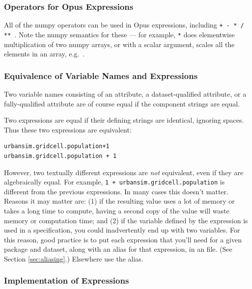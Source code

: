 {\subsubsection{Operators for Opus Expressions}

All of the numpy operators can be used in Opus expressions, including
\verb|+ - * / ** |.  Note the numpy semantics for these --- for example,
\verb|*| does elementwise multiplication of two numpy arrays, or with a
scalar argument, scales all the elements in an array,
e.g.\ .

\subsubsection{Equivalence of Variable Names and Expressions}

Two variable names consisting of an attribute, a dataset-qualified
attribute, or a fully-qualified attribute are of course equal if the
component strings are equal.

Two expressions are equal if their defining strings are identical, ignoring
spaces.  Thus these two expressions are equivalent:

\begin{verbatim}
urbansim.gridcell.population+1
urbansim.gridcell.population + 1
\end{verbatim}

However, two textually different expressions are \emph{not} equivalent,
even if they are algebraically equal.  For example,
\verb|1 + urbansim.gridcell.population| is different from the previous
expressions.  In many cases this doesn't matter.  Reasons it may matter
are: (1) if the resulting value uses a lot of memory or takes a long time
to compute, having a second copy of the value will waste memory or
computation time; and (2) if the variable defined by the expression is used
in a specification, you could inadvertently end up with two variables.  For
this reason, good practice is to put each expression that you'll need for a
given package and dataset, along with an alias for that expression, in an
 file.  (See Section \ref{sec:aliasing}.)  Elsewhere use
the alias.

\subsubsection{Implementation of Expressions}

}
